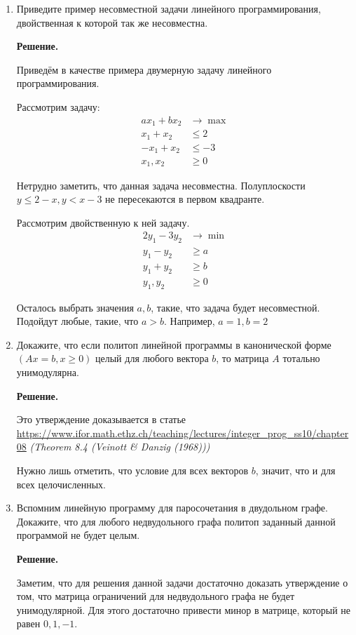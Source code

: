\begin{enumerate}
	\item Приведите пример несовместной задачи линейного программирования, двойственная к которой так же 
	несовместна.
	
	\textbf{Решение.} 
	
	Приведём в качестве примера двумерную задачу линейного программирования.
	
	Рассмотрим задачу:
	\begin{align*}
		a x_1 + b x_2 &\to \max \\
		x_1 + x_2 &\leqslant 2 \\
		-x_1 + x_2 &\leqslant -3\\
		x_1, x_2 &\geqslant 0
	\end{align*}
	
	Нетрудно заметить, что данная задача несовместна. Полуплоскости $y \leqslant 2 - x, y < x - 3$ не пересекаются в первом квадранте.
	
	Рассмотрим двойственную к ней задачу.
	\begin{align*}
		2 y_1 - 3y_2 &\to \min\\
		y_1 - y_2 &\geqslant a \\
		y_1 + y_2 &\geqslant b \\
		y_1, y_2 &\geqslant 0
	\end{align*}
	
	Осталось выбрать значения $a,b$, такие, что задача будет несовместной. Подойдут любые, такие, что $a > b$. Например, $a = 1, b = 2$
	
	\item Докажите, что если политоп линейной программы в канонической форме $(Ax = b, x \geqslant 0)$ целый для 
	любого вектора $b$, то матрица $A$ тотально унимодулярна.
	
	\textbf{Решение.}
	
	Это утверждение доказывается в статье \url{https://www.ifor.math.ethz.ch/teaching/lectures/integer_prog_ss10/chapter08} \textit{(Theorem 8.4 (Veinott \& Danzig (1968)))}
	
	Нужно лишь отметить, что условие для всех векторов $b$, значит, что и для всех целочисленных.
	
	\item Вспомним линейную программу для паросочетания в двудольном графе. Докажите, что для любого 
	недвудольного графа политоп заданный данной программой не будет целым.
	
	\textbf{Решение.}
	
	Заметим, что для решения данной задачи достаточно доказать утверждение о том, что матрица ограничений для 
	недвудольного графа не будет унимодулярной. Для этого достаточно привести минор в матрице, который не равен 
	$0, 1, -1$.
	

\end{enumerate}
